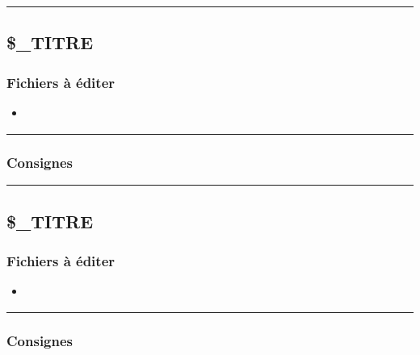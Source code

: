\documentclass[a4paper,10pt]{article}
\begin{document}
\color{green}\par\noindent\rule{\textwidth}{0.4pt}\color{white}

\color{green}
\subsection{\$\_TITRE}\color{white}

\color{blue}
\subsubsection{Fichiers à éditer}\color{white}
\begin{itemize}
    \item \textbf{\color{lime}}
\end{itemize}


\color{blue}\par\noindent\rule{\textwidth}{0.4pt}\color{white}

\color{blue}
\subsubsection{Consignes}\color{white}



\color{green}\par\noindent\rule{\textwidth}{0.4pt}\color{white}

\color{green}
\subsection{\$\_TITRE}\color{white}

\color{blue}
\subsubsection{Fichiers à éditer}\color{white}
\begin{itemize}
    \item \textbf{\color{lime}\color{white}}
\end{itemize}



\color{blue}\par\noindent\rule{\textwidth}{0.4pt}\color{white}

\color{blue}
\subsubsection{Consignes}\color{white}
\end{document}
